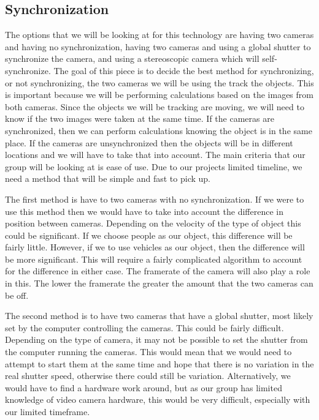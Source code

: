 \documentclass[letterpaper,10pt,onecolumn,draftclsnofoot]{IEEEtran}
\begin{document}
\newpage
\subsection{Synchronization} %


The options that we will be looking at for this technology are having two cameras and having no synchronization, having two cameras and using a global shutter to synchronize the camera, and using a stereoscopic camera which will self-synchronize.
The goal of this piece is to decide the best method for synchronizing, or not synchronizing, the two cameras we will be using the track the objects.
This is important because we will be performing calculations based on the images from both cameras. 
Since the objects we will be tracking are moving, we will need to know if the two images were taken at the same time.
If the cameras are synchronized, then we can perform calculations knowing the object is in the same place.
If the cameras are unsynchronized then the objects will be in different locations and we will have to take that into account.
The main criteria that our group will be looking at is ease of use.
Due to our projects limited timeline, we need a method that will be simple and fast to pick up.

The first method is have to two cameras with no synchronization.
If we were to use this method then we would have to take into account the difference in position between cameras.
Depending on the velocity of the type of object this could be significant.
If we choose people as our object, this difference will be fairly little.
However, if we to use vehicles as our object, then the difference will be more significant.
This will require a fairly complicated algorithm to account for the difference in either case.
The framerate of the camera will also play a role in this.
The lower the framerate the greater the amount that the two cameras can be off.

The second method is to have two cameras that have a global shutter, most likely set by the computer controlling the cameras.
This could be fairly difficult.
Depending on the type of camera, it may not be possible to set the shutter from the computer running the cameras.
This would mean that we would need to attempt to start them at the same time and hope that there is no variation in the real shutter speed, otherwise there could still be variation.
Alternatively, we would have to find a hardware work around, but as our group has limited knowledge of video camera hardware, this would be very difficult, especially with our limited timeframe.
\end{document}
